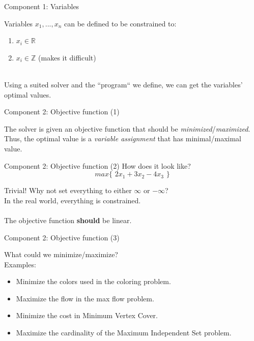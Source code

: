 \documentclass[10pt]{beamer}
\newcommand{\primaryColorB}[1]{\textcolor{mpigreen}{\textbf{#1}}}
\newcommand{\q}[1]{``#1``}
\newcommand{\curlO}{\{\,\,}
\newcommand{\curlC}{\,\,\}}
\begin{document}
\begin{frame}{Component 1: Variables}

Variables $x_1, ..., x_n$ can be defined to be constrained to:
\begin{enumerate}
	\item $x_i\in \mathbb{R}$
	\item $x_i\in \mathbb{Z}$ (makes it difficult)
\end{enumerate}
\,\\
Using a suited solver and the \q{program} we define, we can get the variables' optimal values.
\end{frame}

\begin{frame}{Component 2: Objective function (1)}

The solver is given an objective function that should be \textit{minimized}/\textit{maximized}.\\
Thus, the optimal value is a \textit{variable assignment} that has minimal/maximal value.\\

\end{frame}

\begin{frame}{Component 2: Objective function (2)}
How does it look like?\\

\begin{equation}
	max \curlO 2x_1 + 3x_2 - 4x_3\curlC
\end{equation}

Trivial! Why not set everything to either $\infty$ or $-\infty$?\\
In the real world, everything is constrained.\\\,\\

The objective function \primaryColorB{should} be linear.

\end{frame}


\begin{frame}{Component 2: Objective function (3)}

What could we minimize/maximize?\\
Examples:
\begin{itemize}
	\item Minimize the colors used in the coloring problem.
	\item Maximize the flow in the max flow problem.
	\item Minimize the cost in Minimum Vertex Cover.
	\item Maximize the cardinality of the Maximum Independent Set problem.
\end{itemize}

\end{frame}
\end{document}
